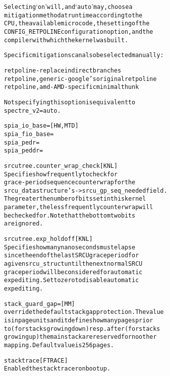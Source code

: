 \documentclass[a4paper,8pt,english]{sphinxmanual}
\begin{document}
\begin{alltt}
                        Selecting `on' will, and `auto' may, choose a
                        mitigation method at run time according to the
                        CPU, the available microcode, the setting of the
                        CONFIG\_RETPOLINE configuration option, and the
                        compiler with which the kernel was built.

                        Specific mitigations can also be selected manually:

                        retpoline         - replace indirect branches
                        retpoline,generic - google's original retpoline
                        retpoline,amd     - AMD-specific minimal thunk

                        Not specifying this option is equivalent to
                        spectre\_v2=auto.

        spia\_io\_base=   {[}HW,MTD{]}
        spia\_fio\_base=
        spia\_pedr=
        spia\_peddr=

        srcutree.counter\_wrap\_check {[}KNL{]}
                        Specifies how frequently to check for
                        grace-period sequence counter wrap for the
                        srcu\_data structure's -\textgreater{}srcu\_gp\_seq\_needed field.
                        The greater the number of bits set in this kernel
                        parameter, the less frequently counter wrap will
                        be checked for.  Note that the bottom two bits
                        are ignored.

        srcutree.exp\_holdoff {[}KNL{]}
                        Specifies how many nanoseconds must elapse
                        since the end of the last SRCU grace period for
                        a given srcu\_struct until the next normal SRCU
                        grace period will be considered for automatic
                        expediting.  Set to zero to disable automatic
                        expediting.

        stack\_guard\_gap=        {[}MM{]}
                        override the default stack gap protection. The value
                        is in page units and it defines how many pages prior
                        to (for stacks growing down) resp. after (for stacks
                        growing up) the main stack are reserved for no other
                        mapping. Default value is 256 pages.

        stacktrace      {[}FTRACE{]}
                        Enabled the stack tracer on boot up.


\end{alltt}
\end{document}
